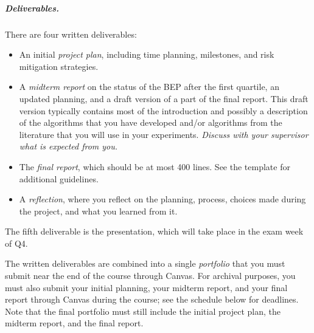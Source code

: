 \documentclass[report,english,cleveref,autoref,a4paper]{lipics-v2021}
\begin{document}
\subparagraph{Deliverables.}
There are four written deliverables:
\begin{itemize}
	\item An initial \emph{project plan}, including time planning, milestones, and risk mitigation strategies. 
	\item A \emph{midterm report} on the status of the BEP after the first quartile, an updated planning, 
          and a draft version of a part of the final report. This draft version typically contains 
          most of the introduction and possibly a description of the algorithms that you have developed 
          and/or algorithms from the literature that you will use in your experiments. \emph{Discuss 
          with your supervisor what is expected from you.}
	\item The \emph{final report}, which should be at most 400 lines. See the template for
          additional guidelines.
	\item A \emph{reflection}, where you reflect on the planning, process, choices made during the project, and what you learned from it.
\end{itemize}
The fifth deliverable is the presentation, which will take place in the exam week of Q4.

The written deliverables are combined into a single \emph{portfolio} that you must submit near the end
of the course through Canvas. For archival purposes, you must also submit your initial planning, 
your midterm report, and your final report through Canvas during the course; see the schedule below for deadlines.
Note that the final portfolio must still include the initial project plan, the midterm report, and the final report.
\end{document}
